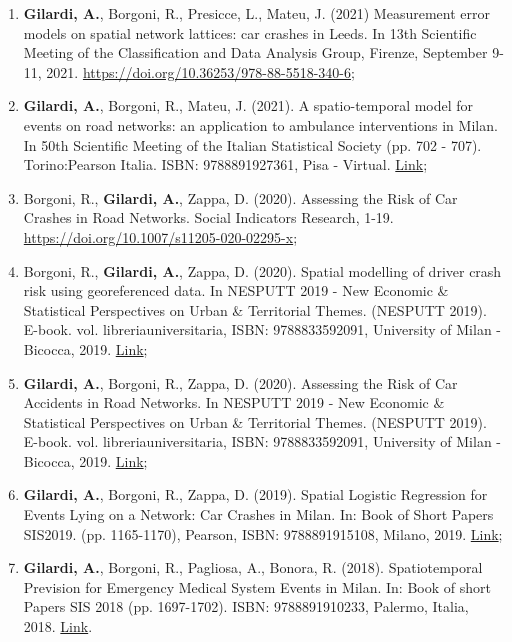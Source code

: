 \documentclass[11pt,a4paper,sans]{moderncv}
\begin{document}
\begin{enumerate}
  \item \textbf{Gilardi, A.}, Borgoni, R., Presicce, L., Mateu, J. (2021) Measurement error models on spatial network lattices: car crashes in Leeds. In 13th Scientific Meeting of the Classification and Data Analysis Group, Firenze, September 9-11, 2021. \url{https://doi.org/10.36253/978-88-5518-340-6}; 
  \item \textbf{Gilardi, A.}, Borgoni, R., Mateu, J. (2021). A spatio-temporal model for events on road networks: an application to ambulance interventions in Milan. In 50th Scientific Meeting of the Italian Statistical Society (pp. 702 - 707). Torino:Pearson Italia. ISBN: 9788891927361, Pisa - Virtual. \href{https://it.pearson.com/content/dam/region-core/italy/pearson-italy/pdf/Docenti/Universit%C3%A0/pearson-sis-book-2021-parte-1.pdf}{Link}; 
  \item Borgoni, R., \textbf{Gilardi, A.}, Zappa, D. (2020). Assessing the Risk of Car Crashes in Road Networks. Social Indicators Research, 1-19. \url{https://doi.org/10.1007/s11205-020-02295-x};
  \item Borgoni, R., \textbf{Gilardi, A.}, Zappa, D. (2020). Spatial modelling of driver crash risk using georeferenced data. In NESPUTT 2019 - New Economic \& Statistical Perspectives on Urban \& Territorial Themes. (NESPUTT 2019). E-book. vol. libreriauniversitaria, ISBN: 9788833592091, University of Milan - Bicocca, 2019. \href{https://www.libreriauniversitaria.it/ebook/9788833592091/autore-riccardo-borgoni/new-economic-statistical-perspectives-on-urban-and-territorial-themes-nesputt-2019-e-book.htm}{Link};
  \item \textbf{Gilardi, A.}, Borgoni, R., Zappa, D. (2020). Assessing the Risk of Car Accidents in Road Networks. In NESPUTT 2019 - New Economic \& Statistical Perspectives on Urban \& Territorial Themes. (NESPUTT 2019). E-book. vol. libreriauniversitaria, ISBN: 9788833592091, University of Milan - Bicocca, 2019.  \href{https://www.libreriauniversitaria.it/ebook/9788833592091/autore-riccardo-borgoni/new-economic-statistical-perspectives-on-urban-and-territorial-themes-nesputt-2019-e-book.htm}{Link};
  \item \textbf{Gilardi, A.}, Borgoni, R., Zappa, D. (2019). Spatial Logistic Regression for Events Lying on a Network: Car Crashes in Milan. In: Book of Short Papers SIS2019. (pp. 1165-1170), Pearson, ISBN: 9788891915108, Milano, 2019.   \href{https://it.pearson.com/content/dam/region-core/italy/pearson-italy/pdf/Dirigenti%20e%20istituzioni/ISTITUZIONI-HE-PDF-sis2019_V4.pdf}{Link};
  \item \textbf{Gilardi, A.}, Borgoni, R., Pagliosa, A., Bonora, R. (2018).  Spatiotemporal Prevision for Emergency Medical System Events in Milan. In: Book of short Papers SIS 2018 (pp. 1697-1702). ISBN: 9788891910233, Palermo, Italia, 2018. \href{https://it.pearson.com/content/dam/region-core/italy/pearson-italy/pdf/Dirigenti%20e%20istituzioni/ISTITUZIONI%20-%20HE%20-%20PDF%20-%20SIS%20V4.pdf}{Link}. 
  \end{enumerate}
\end{document}
